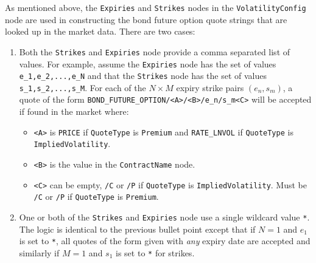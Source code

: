 As mentioned above, the \lstinline!Expiries! and \lstinline!Strikes! nodes in the \lstinline!VolatilityConfig! node 
are used in constructing the bond future option quote strings that are looked up in the market data.
There are two cases:

\begin{enumerate}

\item
  Both the \lstinline!Strikes! and \lstinline!Expiries! node provide a comma separated list of values.
  For example, assume the \lstinline!Expiries! node has the set of values \lstinline!e_1,e_2,...,e_N! 
  and that the \lstinline!Strikes! node has the set of values \lstinline!s_1,s_2,...,s_M!.
  For each of the $N \times M$ expiry strike pairs $(e_n,s_m)$, a quote of the form 
  \lstinline!BOND_FUTURE_OPTION/<A>/<B>/e_n/s_m<C>! will be accepted if found in the market where:
  
  \begin{itemize}
  \item \lstinline!<A>! is \lstinline!PRICE! if \lstinline!QuoteType! is \lstinline!Premium! and \lstinline!RATE_LNVOL! 
    if \lstinline!QuoteType! is \lstinline!ImpliedVolatility!.
  \item \lstinline!<B>! is the value in the \lstinline!ContractName! node.
  \item \lstinline!<C>! can be empty, \lstinline!/C! or \lstinline!/P! if \lstinline!QuoteType! is 
    \lstinline!ImpliedVolatility!. Must be \lstinline!/C! or \lstinline!/P! if \lstinline!QuoteType! is 
    \lstinline!Premium!.
  \end{itemize}

\item
  One or both of the \lstinline!Strikes! and \lstinline!Expiries! node use a single wildcard value \lstinline!*!. The 
  logic is identical to the previous bullet point except that if $N=1$ and $e_1$ is set to \lstinline!*!, all quotes of 
  the form given with \emph{any} expiry date are accepted and similarly if $M=1$ and $s_1$ is set to \lstinline!*! for 
  strikes.

\end{enumerate}
